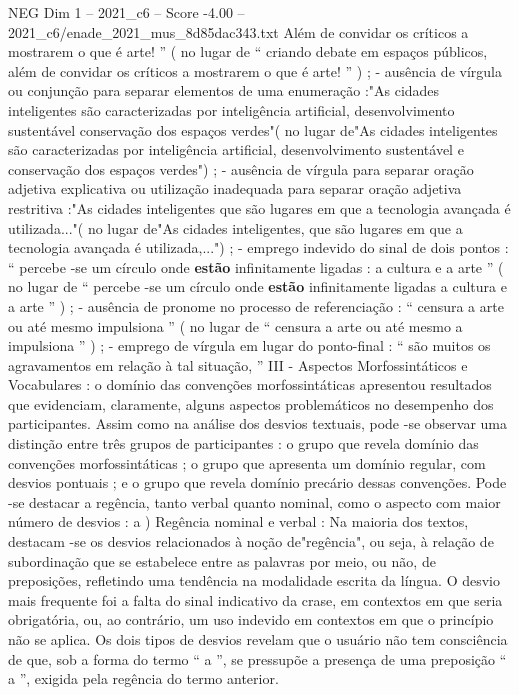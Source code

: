 \begin{textsample}{NEG Dim 1 – 2021\_c6 – Score -4.00 – 2021\_c6/enade\_2021\_mus\_8d85dac343.txt}
Além de convidar os críticos a mostrarem o que é arte! ” ( no lugar de “ criando debate em espaços públicos, além de convidar os críticos a mostrarem o que é arte! ” ) ; - ausência de vírgula ou conjunção para separar elementos de uma enumeração :"As cidades inteligentes são caracterizadas por inteligência artificial, desenvolvimento sustentável conservação dos espaços verdes"( no lugar de"As cidades inteligentes são caracterizadas por inteligência artificial, desenvolvimento sustentável e conservação dos espaços verdes") ; - ausência de vírgula para separar oração adjetiva explicativa ou utilização inadequada para separar oração adjetiva restritiva :"As cidades inteligentes que são lugares em que a tecnologia avançada é utilizada..."( no lugar de"As cidades inteligentes, que são lugares em que a tecnologia avançada é utilizada,...") ; - emprego indevido do sinal de dois pontos : “ percebe -se um círculo onde \textbf{estão} infinitamente ligadas : a cultura e a arte ” ( no lugar de “ percebe -se um círculo onde \textbf{estão} infinitamente ligadas a cultura e a arte ” ) ; - ausência de pronome no processo de referenciação : “ censura a arte ou até mesmo impulsiona ” ( no lugar de “ censura a arte ou até mesmo a impulsiona ” ) ; - emprego de vírgula em lugar do ponto-final : “ são muitos os agravamentos em relação à tal situação, ” III - Aspectos Morfossintáticos e Vocabulares : o domínio das convenções morfossintáticas apresentou resultados que evidenciam, claramente, alguns aspectos problemáticos no desempenho dos participantes.
Assim como na análise dos desvios textuais, pode -se observar uma distinção entre três grupos de participantes : o grupo que revela domínio das convenções morfossintáticas ; o grupo que apresenta um domínio regular, com desvios pontuais ; e o grupo que revela domínio precário dessas convenções.
Pode -se destacar a regência, tanto verbal quanto nominal, como o aspecto com maior número de desvios : a ) Regência nominal e verbal : Na maioria dos textos, destacam -se os desvios relacionados à noção de"regência", ou seja, à relação de subordinação que se estabelece entre as palavras por meio, ou não, de preposições, refletindo uma tendência na modalidade escrita da língua.
O desvio mais frequente foi a falta do sinal indicativo da crase, em contextos em que seria obrigatória, ou, ao contrário, um uso indevido em contextos em que o princípio não se aplica.
Os dois tipos de desvios revelam que o usuário não tem consciência de que, sob a forma do termo “ a ”, se pressupõe a presença de uma preposição “ a ”, exigida pela regência do termo anterior.

\end{textsample}
